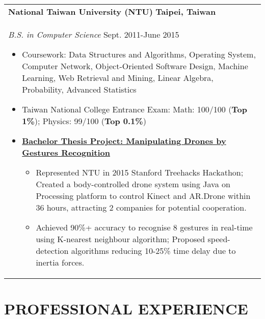 \documentclass[a4paper,10pt]{article} %
\begin{document}
{\begin{tabular}{p{18.5cm}}
{\fontsize{11}{13.2}\textbf{National Taiwan University (NTU)}} \hfill \textbf{Taipei, Taiwan}\\
{\it B.S. in Computer Science} \hfill Sept. 2011-June 2015
\begin{itemize}
\item Coursework: Data Structures and Algorithms, Operating System, Computer Network, Object-Oriented Software Design, Machine Learning, Web Retrieval and Mining, Linear Algebra, Probability, Advanced Statistics 
\item Taiwan National College Entrance Exam:  Math: 100/100 (\textbf{Top 1\%}); Physics: 99/100 (\textbf{Top 0.1\%})
\item \textbf{\href{https://www.youtube.com/watch?v=jxsZaQ6PcXU}{Bachelor Thesis Project: Manipulating Drones by Gestures Recognition}}
\begin{itemize}
	\item Represented NTU in 2015 Stanford Treehacks Hackathon; Created a body-controlled drone system using Java on Processing platform to control Kinect and AR.Drone within 36 hours, attracting 2 companies for potential cooperation. 
	\item Achieved 90\%+ accuracy to recognise 8 gestures in real-time using K-nearest neighbour algorithm; Proposed speed-detection algorithms reducing 10-25\% time delay due to inertia forces. \vspace*{-\baselineskip}
\end{itemize}
\end{itemize} 
\end{tabular}

\section{\textbf{PROFESSIONAL EXPERIENCE}}
\begin{tabular}{p{18.5cm}}


\end{tabular}}
\end{document}

